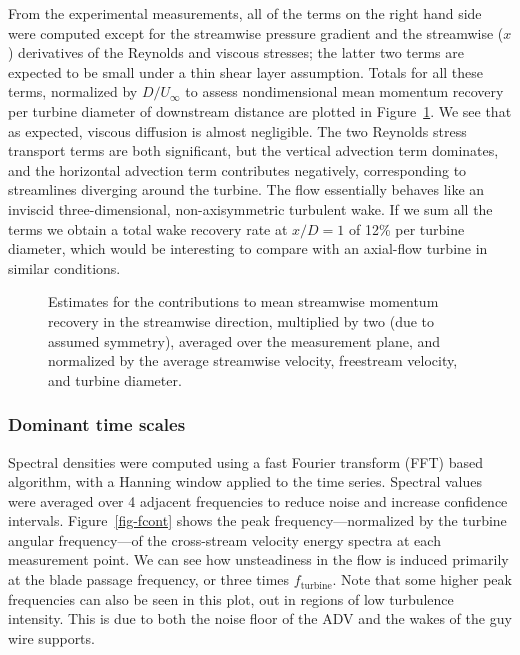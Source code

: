 From the experimental measurements, all of the terms on the right hand side were
computed except for the streamwise pressure gradient and the streamwise ($x$)
derivatives of the Reynolds and viscous stresses; the latter two terms are
expected to be small under a thin shear layer assumption. Totals for all these
terms, normalized by $D/U_\infty$ to assess nondimensional mean momentum
recovery per turbine diameter of downstream distance are plotted in
Figure~\ref{fig-mombargraph}. We see that as expected, viscous diffusion is
almost negligible. The two Reynolds stress transport terms are both significant,
but the vertical advection term dominates, and the horizontal advection term
contributes negatively, corresponding to streamlines diverging around the
turbine. The flow essentially behaves like an inviscid three-dimensional,
non-axisymmetric turbulent wake. If we sum all the terms we obtain a total wake
recovery rate at $x/D=1$ of 12\% per turbine diameter, which would be
interesting to compare with an axial-flow turbine in similar conditions.

\begin{figure}
    \centering
    \caption{Estimates for the contributions to mean streamwise momentum recovery
        in the streamwise direction, multiplied by two (due to assumed symmetry), 
        averaged over the measurement plane, and
        normalized by the average streamwise velocity, freestream velocity, and turbine 
        diameter.}
    \label{fig-mombargraph}
\end{figure}


\subsubsection{Dominant time scales}

Spectral densities were computed using a fast Fourier transform (FFT) based
algorithm, with a Hanning window applied to the time series. Spectral values
were averaged over 4 adjacent frequencies to reduce noise and increase
confidence intervals. Figure~\ref{fig-fcont} shows the peak
frequency---normalized by the turbine angular frequency---of the cross-stream
velocity energy spectra at each measurement point. We can see how unsteadiness
in the flow is induced primarily at the blade passage frequency, or three times
$f_\mathrm{turbine}$. Note that some higher peak frequencies can also be seen in
this plot, out in regions of low turbulence intensity. This is due to both the
noise floor of the ADV and the wakes of the guy wire supports.

